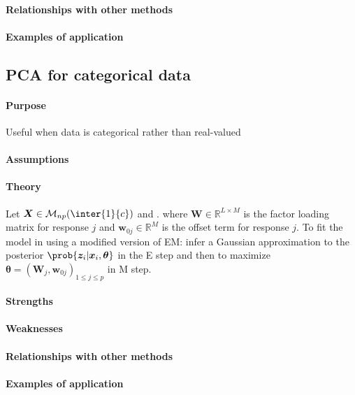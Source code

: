 \paragraph{Relationships with other methods}
\paragraph{Examples of application}

\subsection{PCA for categorical data}
\paragraph{Purpose}
Useful when data is categorical rather than real-valued
\paragraph{Assumptions}
\paragraph{Theory}
Let $\bm{X}\in\mathcal{M}_{np}(\inter{1}{c})$ and .
where $\bm{W}\in\mathbb{R}^{L\times M}$ is the factor loading matrix for response $j$ 
and $\bm{w}_{0j}\in\mathbb{R}^{M}$ is the offset term for response $j$.
To fit the model in using a modified version of EM: infer a Gaussian approximation to 
the posterior $\prob{\bm{z}_{i}|\bm{x}_{i},\bm{\theta}}$ in the E step and then to 
maximize $\bm{\theta} = \left(\bm{W}_{j},\bm{w}_{0j}\right)_{1\leq j\leq p}$ in M step.

\paragraph{Strengths}
\paragraph{Weaknesses}
\paragraph{Relationships with other methods}
\paragraph{Examples of application}

